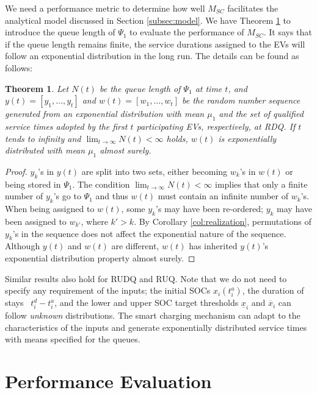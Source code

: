 \documentclass[journal]{IEEEtran}
\newtheorem{theorem}{\textbf{Theorem}}
\begin{document}
We need a performance metric to determine how well $M_{SC}$ facilitates the analytical model discussed in Section \ref{subsec:model}. We have Theorem \ref{thmresult} to introduce the queue length of $\Psi_1$ to evaluate the performance of $M_{SC}$. It says that if the queue length remains finite, the service durations assigned to the EVs will follow an exponential distribution in the long run. The details can be found as follows:
\begin{theorem} \label{thmresult}
Let $N(t)$ be the queue length of $\Psi_1$ at time $t$, and $y(t)=[y_1,\ldots,y_t]$ and $w(t)=[w_1,\ldots,w_t]$ be the random number sequence generated from an exponential distribution with mean $\mu_1$ and the set of qualified service times adopted by the first $t$ participating EVs, respectively, at RDQ.
 If $t$ tends to infinity and $\lim_{t\rightarrow \infty}N(t)<\infty$
holds, $w(t)$ is exponentially distributed with mean $\mu_1$ almost surely.
\end{theorem}
\begin{proof}
$y_k$'s in $y(t)$ are split into two sets, either becoming $w_k$'s in $w(t)$ or being stored in $\Psi_1$.
The condition $\lim_{t\rightarrow \infty}N(t)<\infty$ implies that only a finite number of $ y_k$'s go to $\Psi_1$ and thus $w(t)$ must contain an infinite number of $w_k$'s. When being assigned to $w(t)$, some $y_k$'s may have been re-ordered;  $y_k$ may have been assigned to $w_{k'}$, where $k'>k$. By Corollary  \ref{col:realization}, permutations of $y_k$'s in the sequence does not affect the exponential nature of the sequence. Although $y(t)$ and $w(t)$ are different, $w(t)$ has inherited $y(t)$'s exponential distribution property almost surely.
\end{proof}

Similar results also hold for RUDQ and RUQ.
Note that we do not need to specify any requirement of the inputs; the initial SOCs $x_i(t_i^a)$, the duration of stays \ $t_i^d - t_i^a$, and the lower and upper SOC target thresholds $\underline{x}_i$ and $\overline{x}_i$ can follow \textit{unknown} distributions. The smart charging mechanism can adapt to the characteristics of the inputs and generate exponentially distributed service times with means specified for the queues. 
\section{Performance Evaluation} \label{sec:perf}
\end{document}
